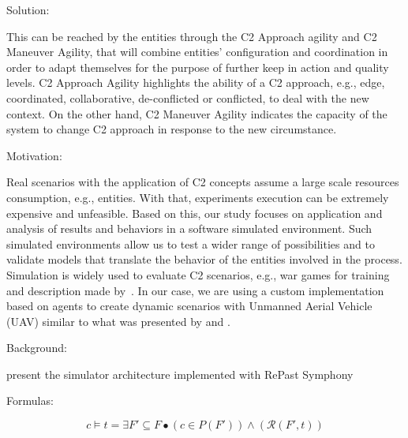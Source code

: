 


Solution: 

This can be reached by the entities through the C2 Approach agility and C2 Maneuver Agility, that will combine entities' configuration and coordination in order to adapt themselves for the purpose of further keep in action and quality levels. C2 Approach Agility highlights the ability of a C2 approach, e.g., edge, coordinated, collaborative, de-conflicted or conflicted, to deal with the new context. On the other hand, C2 Maneuver Agility indicates the capacity of the system to change C2 approach in response to the new circumstance. 




Motivation:

Real scenarios with the application of C2 concepts assume a large scale resources consumption, e.g., entities. With that, experiments execution can be extremely expensive and unfeasible. Based on this, our study focuses on application and analysis of results and behaviors in a software simulated environment. Such simulated environments allow us to test a wider range of possibilities and to validate models that translate the behavior of the entities involved in the process. Simulation is widely used to evaluate C2 scenarios, e.g., war games for training and description made by~\cite{Mason2001}. In our case, we are using a custom implementation based on agents to create dynamic scenarios with Unmanned Aerial Vehicle (UAV) similar to what was presented by \cite{Schwarzrock2017} and \cite{UAV01}.




Background:

present the simulator architecture implemented with RePast Symphony~\citep{ABAR201713}




Formulas:


\begin{equation}
    \label{eq:prop7}
    c \models t = \exists F' \subseteq F \bullet (c \in P(F')) \land (\mathcal{R}(F', t))
\end{equation}



